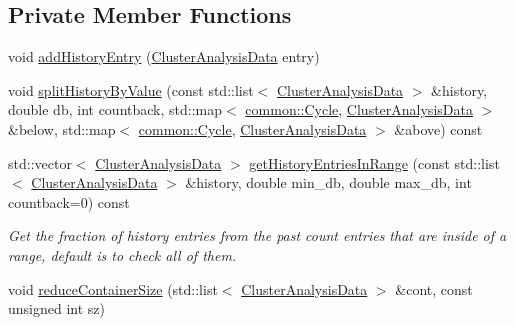 \subsection*{\-Private \-Member \-Functions}
\begin{DoxyCompactItemize}
\item 
void \hyperlink{classcryomesh_1_1manipulators_1_1ClusterArchitect_a2139b33760d3506195f5ad4f452b0223}{add\-History\-Entry} (\hyperlink{classcryomesh_1_1manipulators_1_1ClusterAnalysisData}{\-Cluster\-Analysis\-Data} entry)
\item 
void \hyperlink{classcryomesh_1_1manipulators_1_1ClusterArchitect_acc6793fab1779aaa70ccecd1bfcc4b92}{split\-History\-By\-Value} (const std\-::list$<$ \hyperlink{classcryomesh_1_1manipulators_1_1ClusterAnalysisData}{\-Cluster\-Analysis\-Data} $>$ \&history, double db, int countback, std\-::map$<$ \hyperlink{classcryomesh_1_1common_1_1Cycle}{common\-::\-Cycle}, \hyperlink{classcryomesh_1_1manipulators_1_1ClusterAnalysisData}{\-Cluster\-Analysis\-Data} $>$ \&below, std\-::map$<$ \hyperlink{classcryomesh_1_1common_1_1Cycle}{common\-::\-Cycle}, \hyperlink{classcryomesh_1_1manipulators_1_1ClusterAnalysisData}{\-Cluster\-Analysis\-Data} $>$ \&above) const 
\item 
std\-::vector$<$ \hyperlink{classcryomesh_1_1manipulators_1_1ClusterAnalysisData}{\-Cluster\-Analysis\-Data} $>$ \hyperlink{classcryomesh_1_1manipulators_1_1ClusterArchitect_a4f8d0f159900e6c9b5819cb80e7b1b75}{get\-History\-Entries\-In\-Range} (const std\-::list$<$ \hyperlink{classcryomesh_1_1manipulators_1_1ClusterAnalysisData}{\-Cluster\-Analysis\-Data} $>$ \&history, double min\-\_\-db, double max\-\_\-db, int countback=0) const 
\begin{DoxyCompactList}\small\item\em \-Get the fraction of history entries from the past count entries that are inside of a range, default is to check all of them. \end{DoxyCompactList}\item 
void \hyperlink{classcryomesh_1_1manipulators_1_1ClusterArchitect_aad99204b1d87578ad9f83a7abed7e0e5}{reduce\-Container\-Size} (std\-::list$<$ \hyperlink{classcryomesh_1_1manipulators_1_1ClusterAnalysisData}{\-Cluster\-Analysis\-Data} $>$ \&cont, const unsigned int sz)
\end{DoxyCompactItemize}
